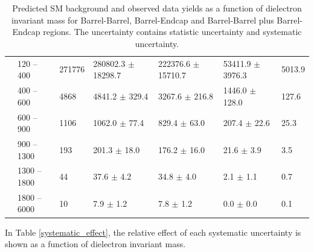 \begin{table}[!htbp]
\begin{center}
{\begin{tabular}{|l|l|l|l|l|l|l|}
& 120   -- 400   & 271776         & 280802.3   $\pm$ 18298.7    & 222376.6   $\pm$ 15710.7          & 53411.9    $\pm$ 3976.3           & 5013.9    \\
& 400   -- 600   & 4868           & 4841.2     $\pm$ 329.4      & 3267.6     $\pm$ 216.8            & 1446.0     $\pm$ 128.0            & 127.6     \\
& 600   -- 900   & 1106           & 1062.0     $\pm$ 77.4       & 829.4      $\pm$ 63.0             & 207.4      $\pm$ 22.6             & 25.3      \\
& 900   -- 1300  & 193            & 201.3      $\pm$ 18.0       & 176.2      $\pm$ 16.0             & 21.6       $\pm$ 3.9              & 3.5       \\
& 1300  -- 1800  & 44             & 37.6       $\pm$ 4.2        & 34.8       $\pm$ 4.0              & 2.1        $\pm$ 1.1              & 0.7       \\
& 1800  -- 6000  & 10             & 7.9        $\pm$ 1.2        & 7.8        $\pm$ 1.2              & 0.0        $\pm$ 0.0              & 0.1       \\  \hline

\end{tabular}}
\end{center}
\caption{Predicted SM background and observed data yields as a function of dielectron invariant mass for Barrel-Barrel, Barrel-Endcap and Barrel-Barrel plus Barrel-Endcap regions. The uncertainty contains statistic uncertainty and systematic uncertainty.}
\label{data-MCn}
\end{table}




In Table \ref{systematic_effect}, the relative effect of each systematic uncertainty is shown as a function of dielectron invariant mass.

